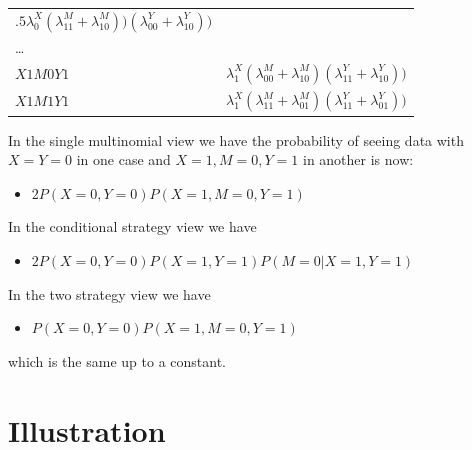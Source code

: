 \documentclass[12pt,]{book}
\providecommand{\tightlist}{%
  \setlength{\itemsep}{0pt}\setlength{\parskip}{0pt}}
\begin{document}
\begin{longtable}[]{@{}ll@{}}
\begin{minipage}[t]{0.84\columnwidth}
\(.5\lambda^X_0(\lambda^M_{11}+\lambda^M_{10}))(\lambda^Y_{00}+\lambda^Y_{10}))\)\strut
\end{minipage}\tabularnewline
\begin{minipage}[t]{0.11\columnwidth}\raggedright
\ldots{}\strut
\end{minipage} & \begin{minipage}[t]{0.84\columnwidth}\raggedright
\strut
\end{minipage}\tabularnewline
\begin{minipage}[t]{0.11\columnwidth}\raggedright
\(X1M0Y1\)\strut
\end{minipage} & \begin{minipage}[t]{0.84\columnwidth}\raggedright
\(\lambda^X_1(\lambda^M_{00}+\lambda^M_{10})(\lambda^Y_{11}+\lambda^Y_{10}))\)\strut
\end{minipage}\tabularnewline
\begin{minipage}[t]{0.11\columnwidth}\raggedright
\(X1M1Y1\)\strut
\end{minipage} & \begin{minipage}[t]{0.84\columnwidth}\raggedright
\(\lambda^X_1(\lambda^M_{11}+\lambda^M_{01})(\lambda^Y_{11}+\lambda^Y_{01}))\)\strut
\end{minipage}\tabularnewline
\bottomrule
\end{longtable}

In the single multinomial view we have the probability of seeing data with \(X=Y=0\) in one case and \(X=1, M=0, Y=1\) in another is now:

\begin{itemize}
\tightlist
\item
  \(2P(X=0, Y=0)P(X=1, M=0, Y=1)\)
\end{itemize}

In the conditional strategy view we have

\begin{itemize}
\tightlist
\item
  \(2P(X=0, Y=0)P(X=1, Y=1)P(M=0 | X=1, Y=1)\)
\end{itemize}

In the two strategy view we have

\begin{itemize}
\tightlist
\item
  \(P(X=0, Y=0)P(X=1, M=0, Y=1)\)
\end{itemize}

which is the same up to a constant.

\hypertarget{illustration}{%
\section{Illustration}\label{illustration}}
\end{document}
